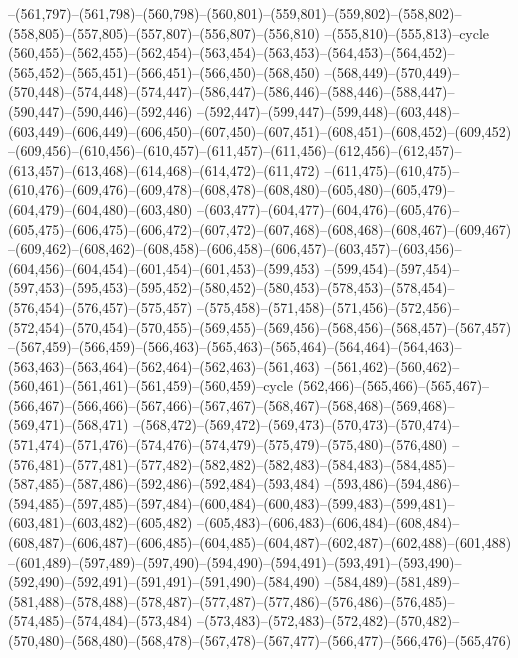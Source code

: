 --(561,797)--(561,798)--(560,798)--(560,801)--(559,801)--(559,802)--(558,802)--(558,805)--(557,805)--(557,807)--(556,807)--(556,810)
--(555,810)--(555,813)--cycle
(560,455)--(562,455)--(562,454)--(563,454)--(563,453)--(564,453)--(564,452)--(565,452)--(565,451)--(566,451)--(566,450)--(568,450)
--(568,449)--(570,449)--(570,448)--(574,448)--(574,447)--(586,447)--(586,446)--(588,446)--(588,447)--(590,447)--(590,446)--(592,446)
--(592,447)--(599,447)--(599,448)--(603,448)--(603,449)--(606,449)--(606,450)--(607,450)--(607,451)--(608,451)--(608,452)--(609,452)
--(609,456)--(610,456)--(610,457)--(611,457)--(611,456)--(612,456)--(612,457)--(613,457)--(613,468)--(614,468)--(614,472)--(611,472)
--(611,475)--(610,475)--(610,476)--(609,476)--(609,478)--(608,478)--(608,480)--(605,480)--(605,479)--(604,479)--(604,480)--(603,480)
--(603,477)--(604,477)--(604,476)--(605,476)--(605,475)--(606,475)--(606,472)--(607,472)--(607,468)--(608,468)--(608,467)--(609,467)
--(609,462)--(608,462)--(608,458)--(606,458)--(606,457)--(603,457)--(603,456)--(604,456)--(604,454)--(601,454)--(601,453)--(599,453)
--(599,454)--(597,454)--(597,453)--(595,453)--(595,452)--(580,452)--(580,453)--(578,453)--(578,454)--(576,454)--(576,457)--(575,457)
--(575,458)--(571,458)--(571,456)--(572,456)--(572,454)--(570,454)--(570,455)--(569,455)--(569,456)--(568,456)--(568,457)--(567,457)
--(567,459)--(566,459)--(566,463)--(565,463)--(565,464)--(564,464)--(564,463)--(563,463)--(563,464)--(562,464)--(562,463)--(561,463)
--(561,462)--(560,462)--(560,461)--(561,461)--(561,459)--(560,459)--cycle
(562,466)--(565,466)--(565,467)--(566,467)--(566,466)--(567,466)--(567,467)--(568,467)--(568,468)--(569,468)--(569,471)--(568,471)
--(568,472)--(569,472)--(569,473)--(570,473)--(570,474)--(571,474)--(571,476)--(574,476)--(574,479)--(575,479)--(575,480)--(576,480)
--(576,481)--(577,481)--(577,482)--(582,482)--(582,483)--(584,483)--(584,485)--(587,485)--(587,486)--(592,486)--(592,484)--(593,484)
--(593,486)--(594,486)--(594,485)--(597,485)--(597,484)--(600,484)--(600,483)--(599,483)--(599,481)--(603,481)--(603,482)--(605,482)
--(605,483)--(606,483)--(606,484)--(608,484)--(608,487)--(606,487)--(606,485)--(604,485)--(604,487)--(602,487)--(602,488)--(601,488)
--(601,489)--(597,489)--(597,490)--(594,490)--(594,491)--(593,491)--(593,490)--(592,490)--(592,491)--(591,491)--(591,490)--(584,490)
--(584,489)--(581,489)--(581,488)--(578,488)--(578,487)--(577,487)--(577,486)--(576,486)--(576,485)--(574,485)--(574,484)--(573,484)
--(573,483)--(572,483)--(572,482)--(570,482)--(570,480)--(568,480)--(568,478)--(567,478)--(567,477)--(566,477)--(566,476)--(565,476)
